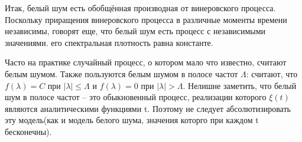 Итак, белый шум есть обобщённая производная от винеровского процесса. Поскольку приращения винеровского процесса в различные моменты времени независимы, говорят еще, что белый шум есть процесс с независимыми значениями. его спектральная плотность равна константе.

Часто на практике случайный процесс, о котором мало что известно, считают белым шумом. Также пользуются белым шумом в полосе частот $\Lambda$: считают, что $f(\lambda) = C$ при $|\lambda| \leq \Lambda$ и 
$f(\lambda) = 0$ при $|\lambda| > \Lambda$. Нелишне заметить, что белый шум в полосе частот -- это обыкновенный процесс, реализации которого $\xi(t)$ являются аналитическими функциями t. Поэтому не следует абсолютизировать эту модель(как и модель белого шума, значения которго при каждом t бесконечны).
